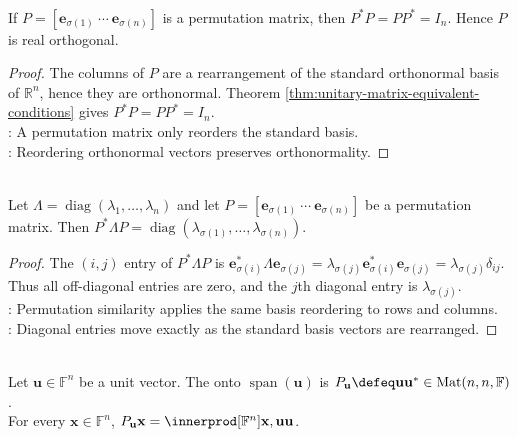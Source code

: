 \begin{proposition} \label{prop:permutation-matrices-are-orthogonal} \\
If $P=[\mathbf{e}_{\sigma(1)}\ \cdots\ \mathbf{e}_{\sigma(n)}]$ is a permutation matrix, then $P^*P=PP^*=I_n$. Hence $P$ is real orthogonal.
\begin{proof}
The columns of $P$ are a rearrangement of the standard orthonormal basis of $\mathbb{R}^n$, hence they are orthonormal. Theorem \ref{thm:unitary-matrix-equivalent-conditions} gives $P^*P=PP^*=I_n$.\\
: A permutation matrix only reorders the standard basis.\\
: Reordering orthonormal vectors preserves orthonormality.
\end{proof}
\end{proposition}

\begin{proposition} \label{prop:permutation-similarity-reorders-diagonal} \\
Let $\Lambda=\operatorname{diag}(\lambda_1,\ldots,\lambda_n)$ and let $P=[\mathbf{e}_{\sigma(1)}\ \cdots\ \mathbf{e}_{\sigma(n)}]$ be a permutation matrix. Then $P^*\Lambda P=\operatorname{diag}(\lambda_{\sigma(1)},\ldots,\lambda_{\sigma(n)})$.
\begin{proof}
The $(i,j)$ entry of $P^*\Lambda P$ is $\mathbf{e}_{\sigma(i)}^*\Lambda\mathbf{e}_{\sigma(j)} =\lambda_{\sigma(j)}\mathbf{e}_{\sigma(i)}^*\mathbf{e}_{\sigma(j)} =\lambda_{\sigma(j)}\delta_{ij}$.\\
Thus all off-diagonal entries are zero, and the $j$th diagonal entry is $\lambda_{\sigma(j)}$.\\
: Permutation similarity applies the same basis reordering to rows and columns.\\
: Diagonal entries move exactly as the standard basis vectors are rearranged.
\end{proof}
\end{proposition}

\begin{definition} \label{def:rank-one-projection-matrix} \\
Let $\mathbf{u}\in\mathbb{F}^n$ be a unit vector. The  onto $\operatorname{span}(\mathbf{u})$ is $P_{\mathbf{u}}\defeq \mathbf{u}\mathbf{u}^*\in\operatorname{Mat}(n,n,\mathbb{F})$.\\
For every $\mathbf{x}\in\mathbb{F}^n$, $P_{\mathbf{u}}\mathbf{x}=\innerprod[\mathbb{F}^n]{\mathbf{x},\mathbf{u}}\mathbf{u}$.
\end{definition}

